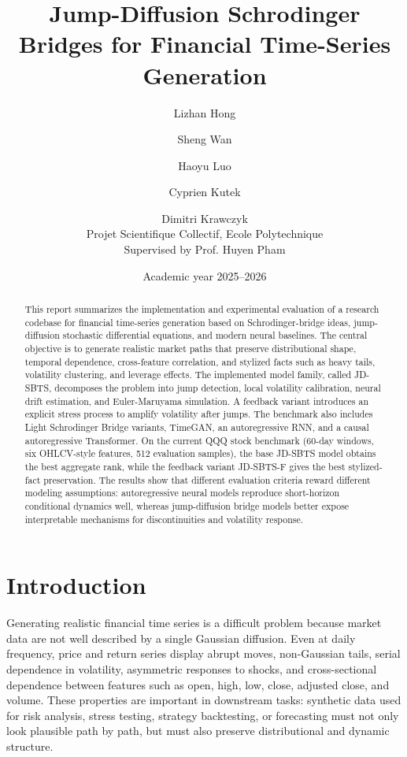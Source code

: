 \documentclass[11pt,a4paper]{article}
\title{\textbf{Jump-Diffusion Schrodinger Bridges for Financial Time-Series Generation}}
\author{
Lizhan Hong \and Sheng Wan \and Haoyu Luo \and Cyprien Kutek \and Dimitri Krawczyk\\
\small Projet Scientifique Collectif, Ecole Polytechnique\\
\small Supervised by Prof. Huyen Pham
}
\date{Academic year 2025--2026}
\begin{document}
\maketitle

\begin{abstract}
This report summarizes the implementation and experimental evaluation of a
research codebase for financial time-series generation based on
Schrodinger-bridge ideas, jump-diffusion stochastic differential equations, and
modern neural baselines. The central objective is to generate realistic market
paths that preserve distributional shape, temporal dependence, cross-feature
correlation, and stylized facts such as heavy tails, volatility clustering, and
leverage effects. The implemented model family, called JD-SBTS, decomposes the
problem into jump detection, local volatility calibration, neural drift
estimation, and Euler-Maruyama simulation. A feedback variant introduces an
explicit stress process to amplify volatility after jumps. The benchmark also
includes Light Schrodinger Bridge variants, TimeGAN, an autoregressive RNN, and
a causal autoregressive Transformer. On the current QQQ stock benchmark
(60-day windows, six OHLCV-style features, 512 evaluation samples), the base
JD-SBTS model obtains the best aggregate rank, while the feedback variant
JD-SBTS-F gives the best stylized-fact preservation. The results show that different
evaluation criteria reward different modeling assumptions: autoregressive
neural models reproduce short-horizon conditional dynamics well, whereas
jump-diffusion bridge models better expose interpretable mechanisms for
discontinuities and volatility response.
\end{abstract}

\tableofcontents
\newpage

\section{Introduction}

Generating realistic financial time series is a difficult problem because market
data are not well described by a single Gaussian diffusion. Even at daily
frequency, price and return series display abrupt moves, non-Gaussian tails,
serial dependence in volatility, asymmetric responses to shocks, and
cross-sectional dependence between features such as open, high, low, close,
adjusted close, and volume. These properties are important in downstream tasks:
synthetic data used for risk analysis, stress testing, strategy backtesting, or
forecasting must not only look plausible path by path, but must also preserve
distributional and dynamic structure.
\end{document}

